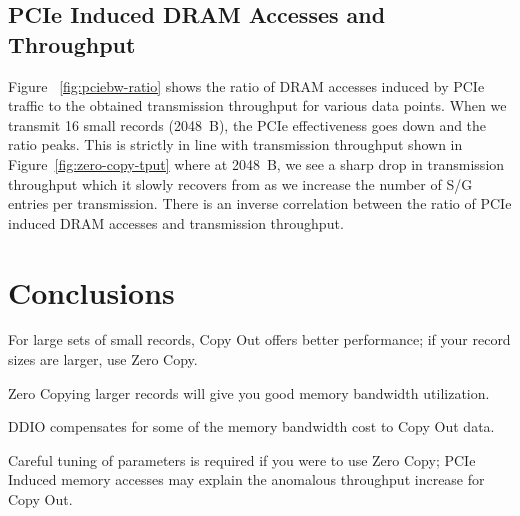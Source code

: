 \subsection{PCIe Induced DRAM Accesses and Throughput}
Figure ~\ref{fig:pciebw-ratio} shows the ratio of DRAM accesses induced by PCIe traffic to the obtained transmission throughput for various data points. When we transmit 16 small records (2048~B),
the PCIe effectiveness goes down and the ratio peaks. This is strictly in line with transmission throughput shown in Figure~\ref{fig:zero-copy-tput} where at 2048~B, we see a sharp drop in transmission 
throughput which it slowly recovers from as we increase the number of S/G entries per transmission. There is an inverse correlation between the ratio of PCIe induced DRAM accesses and transmission throughput.
\newline


\section{Conclusions}
\begin{myitemize}
\setlength\itemsep{0.5em}
\item For large sets of small records, Copy Out offers better performance; if your record sizes are larger, use Zero Copy.
\item Zero Copying larger records will give you good memory bandwidth utilization.
\item DDIO compensates for some of the memory bandwidth cost to Copy Out data.
\item Careful tuning of parameters is required if you were to use Zero Copy; PCIe Induced memory accesses may explain the anomalous throughput increase for Copy Out. 
\end{myitemize}














